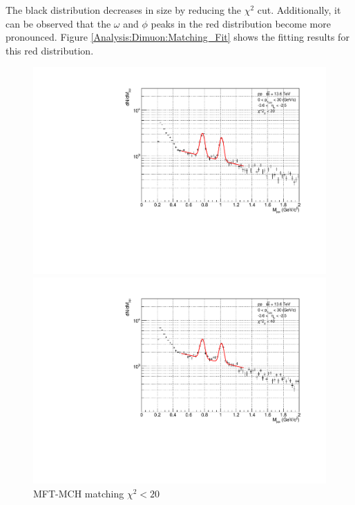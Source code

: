             The black distribution decreases in size by reducing the \(\chi^2\) cut. Additionally, it can be observed that the \(\omega\) and \(\phi\) peaks in the red distribution become more pronounced. Figure \ref{Analysis:Dimuon:Matching_Fit} shows the fitting results for this red distribution.
            \begin{figure}[H]
                \centering
                \begin{minipage}{0.45\textwidth}  
                    \centering
                    \includegraphics[width=\textwidth]{fig/3_4_4_Fit_chi2_20.pdf}
                    \caption*{MFT-MCH matching $\chi^2 < 20$}
                \end{minipage}
                \hfill
                \begin{minipage}{0.45\textwidth}
                    \centering
                    \includegraphics[width=\textwidth]{fig/3_4_4_Fit_chi2_40.pdf}

\end{minipage}
\end{figure}
